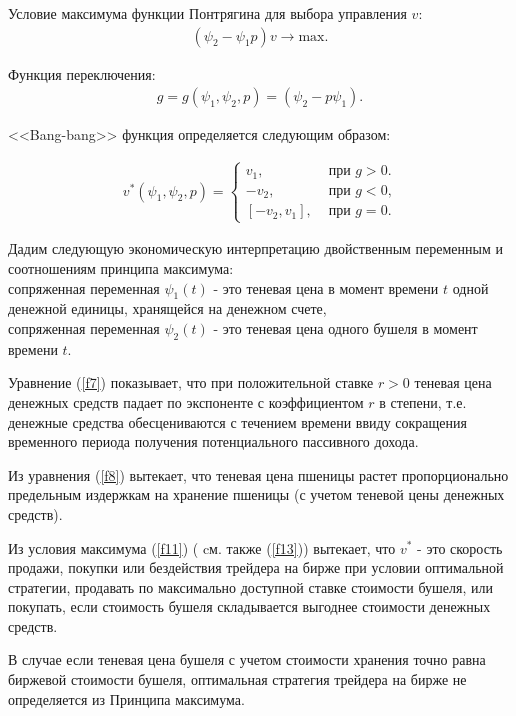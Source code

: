 Условие максимума функции Понтрягина для выбора управления ${v}$: 
\begin{gather}
    (\psi_{2} - \psi_{1} p)v\to \mathrm{max} \label{f11}.
\end{gather} 

Функция переключения:
\begin{align}
g = g(\psi_1 , \psi_2, p)=(\psi_{2} - p \psi_{1}).
\end{align} 


<<Bang-bang>>    функция определяется следующим образом:


\begin{align} \label{f13}
v^*(\psi_1 , \psi_2, p) = 
 \begin{cases}
   v_{1}, & \textrm{ при $g>0$.}\\
   -v_{2}, &  \textrm{ при $g<0$,}\\
   [-v_{2},v_{1}], & \textrm{ при $g=0$}.
 \end{cases}
\end{align}

Дадим следующую экономическую интерпретацию двойственным переменным и соотношениям принципа максимума:\\
 сопряженная переменная $ \psi_1(t) $ - это теневая цена в момент времени ${t}$ одной денежной единицы, хранящейся на денежном счете,\\
 сопряженная переменная $ \psi_2(t) $ - это теневая цена одного бушеля в момент времени ${t}$.
 
 
Уравнение (\ref{f7}) показывает, что при положительной ставке $ r>0 $ теневая цена денежных средств падает по экспоненте с коэффициентом $r$ в степени, т.е.  денежные средства обесцениваются с течением времени ввиду сокращения временного периода получения потенциального пассивного дохода.


Из уравнения (\ref{f8}) вытекает, что теневая цена пшеницы растет пропорционально предельным издержкам на хранение пшеницы (с учетом теневой цены денежных средств).


Из условия максимума (\ref{f11}) \big( cм. также (\ref{f13})\big) вытекает, что  ${v^*}$ - это скорость продажи, покупки или бездействия трейдера на бирже при условии оптимальной стратегии, продавать по максимально доступной  ставке стоимости бушеля, или покупать, если стоимость бушеля складывается выгоднее стоимости денежных средств.


В случае если теневая цена бушеля с учетом стоимости хранения точно равна биржевой стоимости бушеля, оптимальная стратегия трейдера на бирже не определяется из Принципа максимума.


